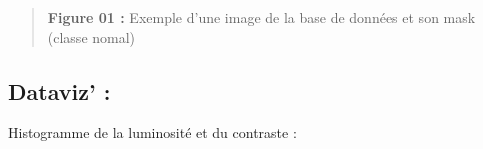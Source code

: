 \begin{quote}
\end{quote}

\begin{quote}
\end{quote}

\begin{quote}
\end{quote}

\begin{quote}
\end{quote}

\begin{quote}
\end{quote}

\begin{quote}
\end{quote}

\begin{quote}
\end{quote}

\begin{quote}
\end{quote}

\begin{quote}
\end{quote}

\begin{quote}
\textbf{ }
\end{quote}

\begin{quote}
\end{quote}

\begin{quote}
\end{quote}

\begin{quote}
\end{quote}

\begin{quote}
\textbf{Figure 01 : }Exemple d'une image de la base de données et son
mask (classe nomal)
\end{quote}

\subsection[Dataviz'
:]{\texorpdfstring{\protect\hypertarget{anchor-9}{}{}\protect\hypertarget{anchor-10}{}{}\protect\hypertarget{anchor-11}{}{}Dataviz'
:}{Dataviz' :}}\label{dataviz}

Histogramme de la luminosité et du contraste :

